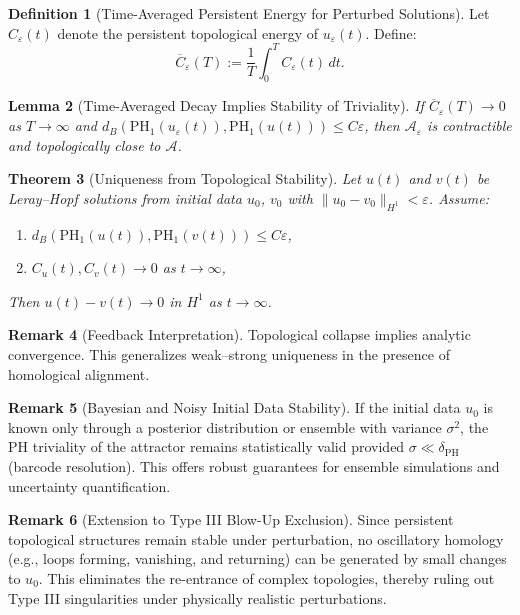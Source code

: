 \documentclass[11pt]{article}
\newtheorem{theorem}{Theorem}[section]
\newtheorem{lemma}[theorem]{Lemma}
\theoremstyle{definition}
\newtheorem{definition}[theorem]{Definition}
\newtheorem{remark}[theorem]{Remark}
\begin{document}
\begin{definition}[Time-Averaged Persistent Energy for Perturbed Solutions]
Let $C_\varepsilon(t)$ denote the persistent topological energy of $u_\varepsilon(t)$. Define:
\[
\overline{C}_\varepsilon(T) := \frac{1}{T} \int_0^T C_\varepsilon(t)\, dt.
\]
\end{definition}

\begin{lemma}[Time-Averaged Decay Implies Stability of Triviality]
If $\overline{C}_\varepsilon(T) \to 0$ as $T \to \infty$ and $d_B(\mathrm{PH}_1(u_\varepsilon(t)), \mathrm{PH}_1(u(t))) \le C \varepsilon$, then $\mathcal{A}_\varepsilon$ is contractible and topologically close to $\mathcal{A}$.
\end{lemma}

\begin{theorem}[Uniqueness from Topological Stability]
Let $u(t)$ and $v(t)$ be Leray--Hopf solutions from initial data $u_0$, $v_0$ with $\|u_0 - v_0\|_{H^1} < \varepsilon$. Assume:
\begin{enumerate}
  \item $d_B(\mathrm{PH}_1(u(t)), \mathrm{PH}_1(v(t))) \leq C\varepsilon$,
  \item $C_u(t), C_v(t) \to 0$ as $t \to \infty$,
\end{enumerate}
Then $u(t) - v(t) \to 0$ in $H^1$ as $t \to \infty$.
\end{theorem}

\begin{remark}[Feedback Interpretation]
Topological collapse implies analytic convergence. This generalizes weak--strong uniqueness in the presence of homological alignment.
\end{remark}

\begin{remark}[Bayesian and Noisy Initial Data Stability]
If the initial data $u_0$ is known only through a posterior distribution or ensemble with variance $\sigma^2$, the PH triviality of the attractor remains statistically valid provided $\sigma \ll \delta_{\mathrm{PH}}$ (barcode resolution). This offers robust guarantees for ensemble simulations and uncertainty quantification.
\end{remark}

\begin{remark}[Extension to Type III Blow-Up Exclusion]
Since persistent topological structures remain stable under perturbation, no oscillatory homology (e.g., loops forming, vanishing, and returning) can be generated by small changes to $u_0$. This eliminates the re-entrance of complex topologies, thereby ruling out Type III singularities under physically realistic perturbations.
\end{remark}
\end{document}

